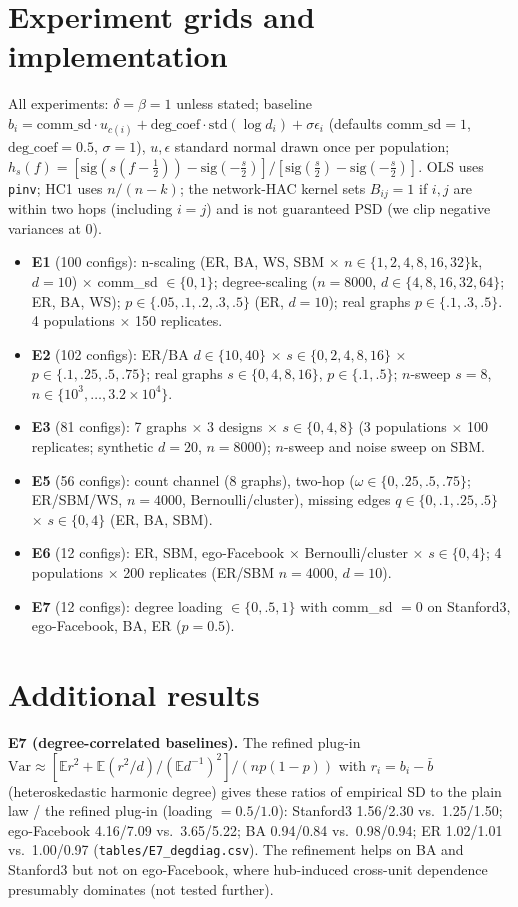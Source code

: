 \documentclass{article}
\theoremstyle{plain}
\theoremstyle{remark}
\newcommand{\E}{\mathbb{E}}
\begin{document}
\section{Experiment grids and implementation}\label{app:grids}
All experiments: $\delta=\beta=1$ unless stated; baseline $b_i=\mathrm{comm\_sd}\cdot u_{c(i)}+\mathrm{deg\_coef}\cdot\mathrm{std}(\log d_i)+\sigma\epsilon_i$ (defaults $\mathrm{comm\_sd}=1$, $\mathrm{deg\_coef}=0.5$, $\sigma=1$), $u,\epsilon$ standard normal drawn once per population; $h_s(f)=[\mathrm{sig}(s(f-\tfrac12))-\mathrm{sig}(-\tfrac s2)]/[\mathrm{sig}(\tfrac s2)-\mathrm{sig}(-\tfrac s2)]$. OLS uses \texttt{pinv}; HC1 uses $n/(n-k)$; the network-HAC kernel sets $B_{ij}=1$ if $i,j$ are within two hops (including $i=j$) and is not guaranteed PSD (we clip negative variances at 0). 
\begin{itemize}\itemsep0pt
\item \textbf{E1} (100 configs): n-scaling (ER, BA, WS, SBM $\times$ $n\in\{1,2,4,8,16,32\}\mathrm{k}$, $d=10$) $\times$ comm\_sd $\in\{0,1\}$; degree-scaling ($n=8000$, $d\in\{4,8,16,32,64\}$; ER, BA, WS); $p\in\{.05,.1,.2,.3,.5\}$ (ER, $d=10$); real graphs $p\in\{.1,.3,.5\}$. 4 populations $\times$ 150 replicates.
\item \textbf{E2} (102 configs): ER/BA $d\in\{10,40\}$ $\times$ $s\in\{0,2,4,8,16\}$ $\times$ $p\in\{.1,.25,.5,.75\}$; real graphs $s\in\{0,4,8,16\}$, $p\in\{.1,.5\}$; $n$-sweep $s=8$, $n\in\{10^3,\dots,3.2\times10^4\}$.
\item \textbf{E3} (81 configs): 7 graphs $\times$ 3 designs $\times$ $s\in\{0,4,8\}$ (3 populations $\times$ 100 replicates; synthetic $d=20$, $n=8000$); $n$-sweep and noise sweep on SBM.
\item \textbf{E5} (56 configs): count channel (8 graphs), two-hop ($\omega\in\{0,.25,.5,.75\}$; ER/SBM/WS, $n=4000$, Bernoulli/cluster), missing edges $q\in\{0,.1,.25,.5\}$ $\times$ $s\in\{0,4\}$ (ER, BA, SBM).
\item \textbf{E6} (12 configs): ER, SBM, ego-Facebook $\times$ Bernoulli/cluster $\times$ $s\in\{0,4\}$; 4 populations $\times$ 200 replicates (ER/SBM $n=4000$, $d=10$).
\item \textbf{E7} (12 configs): degree loading $\in\{0,.5,1\}$ with comm\_sd $=0$ on Stanford3, ego-Facebook, BA, ER ($p=0.5$).
\end{itemize}

\section{Additional results}\label{app:e7}
\textbf{E7 (degree-correlated baselines).} The refined plug-in $\mathrm{Var}\approx[\E r^2+\E(r^2/d)/(\E d^{-1})^2]/(np(1-p))$ with $r_i=b_i-\bar b$ (heteroskedastic harmonic degree) gives these ratios of empirical SD to the plain law / the refined plug-in (loading $=0.5/1.0$): Stanford3 1.56/2.30 vs.\ 1.25/1.50; ego-Facebook 4.16/7.09 vs.\ 3.65/5.22; BA 0.94/0.84 vs.\ 0.98/0.94; ER 1.02/1.01 vs.\ 1.00/0.97 (\texttt{tables/E7\_degdiag.csv}). The refinement helps on BA and Stanford3 but not on ego-Facebook, where hub-induced cross-unit dependence presumably dominates (not tested further).
\end{document}
